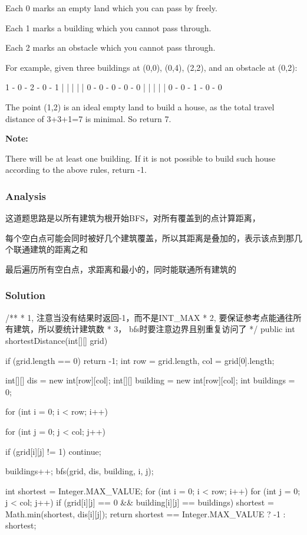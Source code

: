 Each 0 marks an empty land which you can pass by freely.

Each 1 marks a building which you cannot pass through.

Each 2 marks an obstacle which you cannot pass through.

For example, given three buildings at (0,0), (0,4), (2,2), and an obstacle at (0,2):

\begin{Code}
1 - 0 - 2 - 0 - 1
|   |   |   |   |
0 - 0 - 0 - 0 - 0
|   |   |   |   |
0 - 0 - 1 - 0 - 0
\end{Code}

The point (1,2) is an ideal empty land to build a house, as the total travel distance of 3+3+1=7 is minimal. So return 7.

\textbf{Note:}

There will be at least one building. If it is not possible to build such house according to the above rules, return -1.

\subsubsection{Analysis}

这道题思路是以所有建筑为根开始BFS，对所有覆盖到的点计算距离，

每个空白点可能会同时被好几个建筑覆盖，所以其距离是叠加的，表示该点到那几个联通建筑的距离之和

最后遍历所有空白点，求距离和最小的，同时能联通所有建筑的

\newpage

\subsubsection{Solution}

\begin{Code}
/**
 * 1, 注意当没有结果时返回-1，而不是INT_MAX
 * 2, 要保证参考点能通往所有建筑，所以要统计建筑数
 * 3， bfs时要注意边界且别重复访问了
 */
public int shortestDistance(int[][] grid) {
    if (grid.length == 0) {
        return -1;
    }
    int row = grid.length, col = grid[0].length;

    int[][] dis = new int[row][col];
    int[][] building = new int[row][col];
    int buildings = 0;

    for (int i = 0; i < row; i++) {
        for (int j = 0; j < col; j++) {
            if (grid[i][j] != 1) {
                continue;
            }

            buildings++;
            bfs(grid, dis, building, i, j);
        }
    }

    int shortest = Integer.MAX_VALUE;
    for (int i = 0; i < row; i++) {
        for (int j = 0; j < col; j++) {
            if (grid[i][j] == 0 && building[i][j] == buildings) {
                shortest = Math.min(shortest, dis[i][j]);
            }
        }
    }
    return shortest == Integer.MAX_VALUE ? -1 : shortest;
}
\end{Code}

